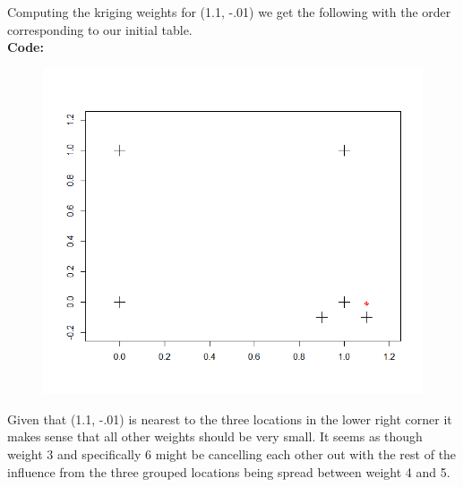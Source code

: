 \documentclass[12pt]{article}
\makeatletter
\theoremstyle{homework}
\newenvironment{exercise}[1]
{\def\@currentlabel{#1}\exercisecore}
{\endexercisecore}
\makeatother
\begin{document}
\begin{exercise}{3}
  Computing the kriging weights for (1.1, -.01) we get the following with the order corresponding to our initial table. 
  \begin{equation*}
    [-0.006830, -0.000545,  0.034600,  0.501000,  0.555000, -0.083900]
  \end{equation*}
  \textbf{Code:}
  \begin{center}
  
  \end{center}
  \begin{figure}[H]
    \begin{center}
    \includegraphics[width = \textwidth]{Rplot08.png}
    \end{center}
  \end{figure}
  Given that (1.1, -.01) is nearest to the three locations in the lower right corner it makes sense that all other weights should be 
  very small. It seems as though weight 3 and specifically 6 might be cancelling each other out with the rest of the influence from the three grouped 
  locations being spread between weight 4 and 5.\\






\end{exercise}
\end{document}
